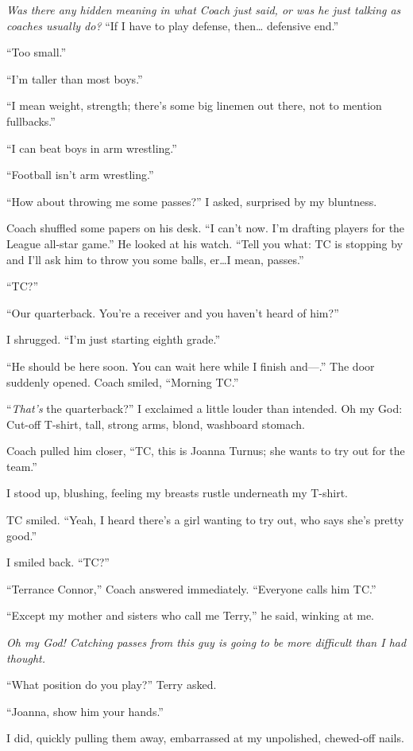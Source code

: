 \emph{Was there any hidden meaning in what Coach just said, or was he
just talking as coaches usually do?} ``If I have to play defense,
then\ldots{} defensive end.''

``Too small.''

``I'm taller than most boys.''

``I mean weight, strength; there's some big linemen out there, not to
mention fullbacks.''

``I can beat boys in arm wrestling.''

``Football isn't arm wrestling.''

``How about throwing me some passes?'' I asked, surprised by my
bluntness.

Coach shuffled some papers on his desk. ``I can't now. I'm drafting
players for the League all-star game.'' He looked at his watch. ``Tell
you what: TC is stopping by and I'll ask him to throw you some balls,
er\ldots I mean, passes.''

``TC?''

``Our quarterback. You're a receiver and you haven't heard of him?''

I shrugged. ``I'm just starting eighth grade.''

``He should be here soon. You can wait here while I finish and---.'' The
door suddenly opened. Coach smiled, ``Morning TC.''

``\emph{That's} the quarterback?'' I exclaimed a little louder than
intended. Oh my God: Cut-off T-shirt, tall, strong arms, blond,
washboard stomach.

Coach pulled him closer, ``TC, this is Joanna Turnus; she wants to try
out for the team.''

I stood up, blushing, feeling my breasts rustle underneath my T-shirt.

TC smiled. ``Yeah, I heard there's a girl wanting to try out, who says
she's pretty good.''

I smiled back. ``TC?''

``Terrance Connor,'' Coach answered immediately. ``Everyone calls him
TC.''

``Except my mother and sisters who call me Terry,'' he said, winking at
me.

\emph{Oh my God! Catching passes from this guy is going to be more
difficult than I had thought.}

``What position do you play?'' Terry asked.

``Joanna, show him your hands.''

I did, quickly pulling them away, embarrassed at my unpolished,
chewed-off nails.

